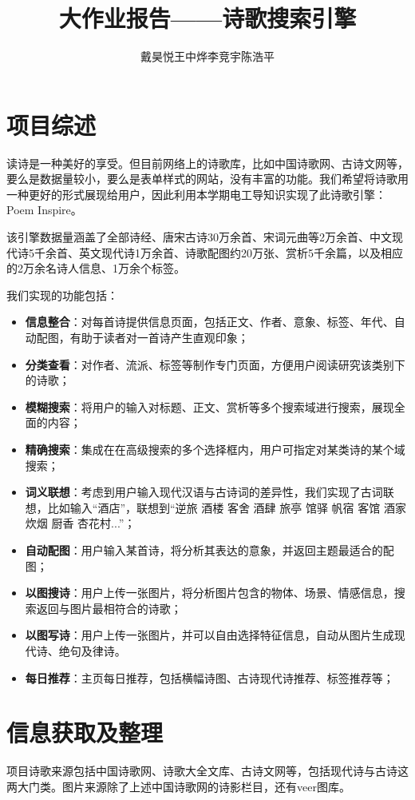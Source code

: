 \documentclass[a4paper, 10pt]{article}
\title{大作业报告——诗歌搜索引擎}
\author{戴昊悦\quad 王中烨\quad 李竞宇\quad 陈浩平}
\begin{document}
\maketitle

\section{项目综述}
读诗是一种美好的享受。但目前网络上的诗歌库，比如中国诗歌网、古诗文网等，要么是数据量较小，要么是表单样式的网站，没有丰富的功能。我们希望将诗歌用一种更好的形式展现给用户，因此利用本学期电工导知识实现了此诗歌引擎：Poem Inspire。

该引擎数据量涵盖了全部诗经、唐宋古诗30万余首、宋词元曲等2万余首、中文现代诗5千余首、英文现代诗1万余首、诗歌配图约20万张、赏析5千余篇，以及相应的2万余名诗人信息、1万余个标签。

我们实现的功能包括：
\begin{itemize}
\setlength{\itemsep}{0pt}
\setlength{\parsep}{0pt}
\setlength{\parskip}{0pt}
    \item \textbf{信息整合}：对每首诗提供信息页面，包括正文、作者、意象、标签、年代、自动配图，有助于读者对一首诗产生直观印象；
    \item \textbf{分类查看}：对作者、流派、标签等制作专门页面，方便用户阅读研究该类别下的诗歌；
    \item \textbf{模糊搜索}：将用户的输入对标题、正文、赏析等多个搜索域进行搜索，展现全面的内容；
    \item \textbf{精确搜索}：集成在在高级搜索的多个选择框内，用户可指定对某类诗的某个域搜索；
    \item \textbf{词义联想}：考虑到用户输入现代汉语与古诗词的差异性，我们实现了古词联想，比如输入“酒店”，联想到“逆旅 酒楼 客舍 酒肆 旅亭 馆驿 帆宿 客馆 酒家 炊烟 厨香 杏花村...”；
    \item \textbf{自动配图}：用户输入某首诗，将分析其表达的意象，并返回主题最适合的配图；
    \item \textbf{以图搜诗}：用户上传一张图片，将分析图片包含的物体、场景、情感信息，搜索返回与图片最相符合的诗歌；
    \item \textbf{以图写诗}：用户上传一张图片，并可以自由选择特征信息，自动从图片生成现代诗、绝句及律诗。
    \item \textbf{每日推荐}：主页每日推荐，包括横幅诗图、古诗现代诗推荐、标签推荐等；
\end{itemize}

\section{信息获取及整理}
项目诗歌来源包括中国诗歌网、诗歌大全文库、古诗文网等，包括现代诗与古诗这两大门类。图片来源除了上述中国诗歌网的诗影栏目，还有veer图库。
\end{document}
